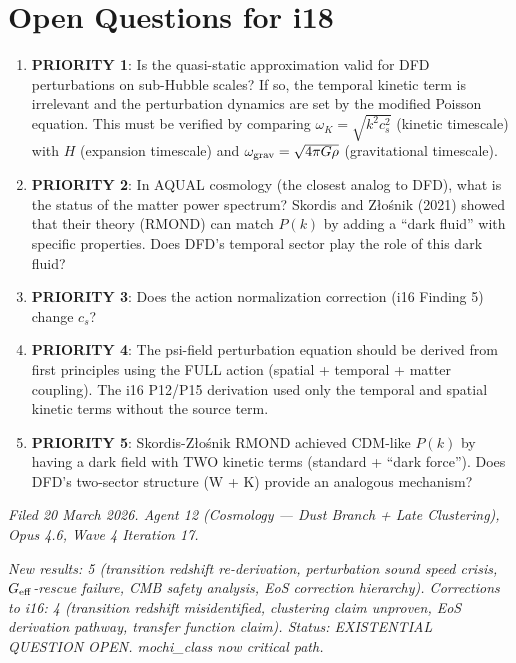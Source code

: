 \documentclass[11pt]{article}
\newcommand{\Geff}{G_{\rm eff}}
\begin{document}
\section*{Open Questions for i18}

\begin{enumerate}
\item \textbf{PRIORITY 1}: Is the quasi-static approximation valid for
  DFD perturbations on sub-Hubble scales? If so, the temporal kinetic
  term is irrelevant and the perturbation dynamics are set by the
  modified Poisson equation. This must be verified by comparing
  $\omega_K = \sqrt{k^2 c_s^2}$ (kinetic timescale) with $H$
  (expansion timescale) and $\omega_{\rm grav} = \sqrt{4\pi G\rho}$
  (gravitational timescale).

\item \textbf{PRIORITY 2}: In AQUAL cosmology (the closest analog to
  DFD), what is the status of the matter power spectrum? Skordis and
  Z\l{}o\'snik (2021) showed that their theory (RMOND) can match
  $P(k)$ by adding a ``dark fluid'' with specific properties. Does
  DFD's temporal sector play the role of this dark fluid?

\item \textbf{PRIORITY 3}: Does the action normalization correction
  (i16 Finding 5) change $c_s$?

\item \textbf{PRIORITY 4}: The psi-field perturbation equation should
  be derived from first principles using the FULL action (spatial +
  temporal + matter coupling). The i16 P12/P15 derivation used only
  the temporal and spatial kinetic terms without the source term.

\item \textbf{PRIORITY 5}: Skordis-Z\l{}o\'snik RMOND achieved
  CDM-like $P(k)$ by having a dark field with TWO kinetic terms
  (standard + ``dark force''). Does DFD's two-sector structure
  (W + K) provide an analogous mechanism?
\end{enumerate}

\vspace{2em}

\textit{Filed 20 March 2026. Agent 12 (Cosmology --- Dust Branch
+ Late Clustering), Opus 4.6, Wave 4 Iteration 17.}

\textit{New results: 5 (transition redshift re-derivation,
perturbation sound speed crisis, $\Geff$-rescue failure,
CMB safety analysis, EoS correction hierarchy).
Corrections to i16: 4 (transition redshift misidentified,
clustering claim unproven, EoS derivation pathway, transfer function
claim). Status: EXISTENTIAL QUESTION OPEN. mochi\_class now
critical path.}
\end{document}
